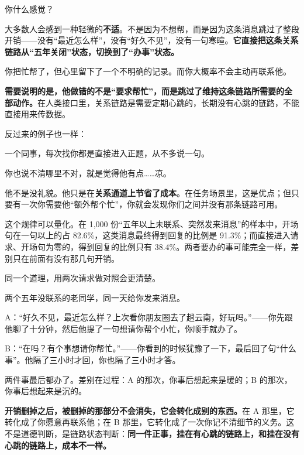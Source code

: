 你什么感觉？

大多数人会感到一种轻微的\textbf{不适}。不是因为不想帮，而是因为这条消息跳过了整段开销——没有“最近怎么样”，没有“好久不见”，没有一句寒暄。\textbf{它直接把这条关系链路从“五年关闭”状态，切换到了“办事”状态。}

你把忙帮了，但心里留下了一个不明确的记录。而你大概率不会主动再联系他。

\textbf{需要说明的是，他做错的不是“要求帮忙”，而是跳过了维持这条链路所需要的全部动作。}在人类接口里，关系链路是需要定期心跳的，长期没有心跳的链路，不能直接用来传数据。

反过来的例子也一样：

\begin{mdquote}
一个同事，每次找你都是直接进入正题，从不多说一句。\par
你也说不清哪里不对，就是觉得他有点……凉。
\end{mdquote}

他不是没礼貌。他只是在\textbf{关系通道上节省了成本}。在任务场景里，这是优点；但只要有一次你需要他“额外帮个忙”，你就会发现你们之间并没有那条链路可用。

这个规律可以量化。在 1,000 份“五年以上未联系、突然发来消息”的样本中，开场句在一句以上的占 82.6\%，这类消息最终得到回复的比例是 91.3\%；而直接进入请求、开场句为零的，得到回复的比例只有 38.4\%。两者要办的事可能完全一样，差别只在前面有没有那几句开销。

同一个道理，用两次请求做对照会更清楚。

\par
\begin{mdquote}
两个五年没联系的老同学，同一天给你发来消息。\par
\vspace{0.3\baselineskip}
A：“好久不见，最近怎么样？上次看你朋友圈去了趟云南，好玩吗。”——你先跟他聊了十分钟，然后他提了一句想请你帮个小忙，你顺手就办了。\par
\vspace{0.3\baselineskip}
B：“在吗？有个事想请你帮忙。”——你看到的时候犹豫了一下，最后回了句“什么事”。他隔了三小时才回，你也隔了三小时才答。\par
\vspace{0.3\baselineskip}
两件事最后都办了。差别在过程：A 的那次，你事后想起来是暖的；B 的那次，你事后想起来是沉的。
\end{mdquote}

\textbf{开销删掉之后，被删掉的那部分不会消失，它会转化成别的东西。}在 A 那里，它转化成了你愿意再联系他；在 B 那里，它转化成了一次你记不清细节的义务。这不是道德判断，是链路状态判断：\textbf{同一件正事，挂在有心跳的链路上，和挂在没有心跳的链路上，成本不一样。}

